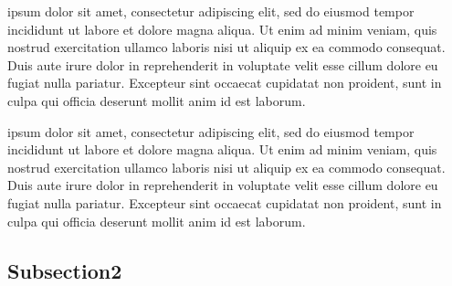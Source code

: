 ipsum dolor sit amet, consectetur adipiscing elit, sed do eiusmod tempor incididunt ut labore et dolore magna aliqua. Ut enim ad minim veniam, quis nostrud exercitation ullamco laboris nisi ut aliquip ex ea commodo consequat. Duis aute irure dolor in reprehenderit in voluptate velit esse cillum dolore eu fugiat nulla pariatur. Excepteur sint occaecat cupidatat non proident, sunt in culpa qui officia deserunt mollit anim id est laborum.

ipsum dolor sit amet, consectetur adipiscing elit, sed do eiusmod tempor incididunt ut labore et dolore magna aliqua. Ut enim ad minim veniam, quis nostrud exercitation ullamco laboris nisi ut aliquip ex ea commodo consequat. Duis aute irure dolor in reprehenderit in voluptate velit esse cillum dolore eu fugiat nulla pariatur. Excepteur sint occaecat cupidatat non proident, sunt in culpa qui officia deserunt mollit anim id est laborum.




\subsection{Subsection2}